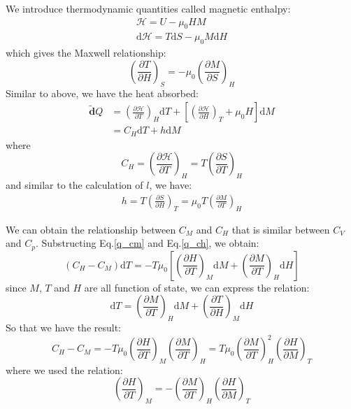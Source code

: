 \documentclass{article}
\newcommand{\pfrac}[2]{\frac{\partial #1}{\partial #2}}
\newcommand{\dbar}{\mathbf{\tilde{d}}}
\newcommand{\dnor}{\text{d}}
\begin{document}
We introduce thermodynamic quantities called magnetic enthalpy:
\begin{gather}
    \mathcal{H} = U - \mu_0 H M \\
    \dnor \mathcal{H} = T \dnor S - \mu_0 M \dnor H
\end{gather}
which gives the Maxwell relationship:
\begin{equation}
    \left( \pfrac{T}{H} \right)_S = - \mu_0 \left( \pfrac{M}{S} \right)_H
\end{equation}
Similar to above, we have the heat absorbed:
\begin{align}
    \dbar Q &= \left(\pfrac{\mathcal{H}}{T}\right)_H \dnor T + \left[ \left(\pfrac{\mathcal{H}}{H}\right)_T + \mu_0 H \right] \dnor M \\
            &= C_H \dnor T + h \dnor M \label{q_ch}
\end{align}
where
\begin{equation}
    C_H = \left(\pfrac{\mathcal{H}}{T}\right)_H = T \left(\pfrac{S}{T}\right)_H
\end{equation}
and similar to the calculation of $l$, we have:
\begin{eqnarray}
    h = T \left(\pfrac{S}{H}\right)_T = \mu_0 T \left(\pfrac{M}{T}\right)_H
\end{eqnarray}

We can obtain the relationship between $C_M$ and $C_H$ that is similar between $C_V$ and $C_p$. 
Substructing Eq.\ref{q_cm} and Eq.\ref{q_ch}, we obtain:
\begin{equation}
    (C_H - C_M) \dnor T = -T\mu_0 \left[ \left(\pfrac{H}{T}\right)_M \dnor M + \left(\pfrac{M}{T}\right)_H \dnor H \right]
\end{equation}
since $M$, $T$ and $H$ are all function of state, we can express the relation:
\begin{equation}
    \dnor T = \left(\pfrac{M}{T}\right)_H \dnor M + \left(\pfrac{T}{H}\right)_M \dnor H
\end{equation}
So that we have the result:
\begin{equation}
    C_H - C_M = - T\mu_0 \left(\pfrac{H}{T}\right)_M \left(\pfrac{M}{T}\right)_H 
    = T\mu_0 \left(\pfrac{M}{T}\right)_H^2 \left(\pfrac{H}{M}\right)_T 
\end{equation}
where we used the relation:
\begin{equation}
    \left(\pfrac{H}{T}\right)_M = - \left(\pfrac{M}{T}\right)_H \left(\pfrac{H}{M}\right)_T 
\end{equation}
\end{document}
